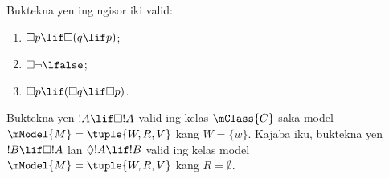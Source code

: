 \documentclass[../../../include/open-logic-section]{subfiles}
\begin{document}
\begin{prob}
  Buktekna yen ing ngisor iki valid:
  \begin{enumerate}
  \item $\Box p \lif \Box (q \lif p)$;
  \item $\Box \lnot \lfalse$;
  \item $\Box p \lif (\Box q \lif \Box p)$.
  \end{enumerate}
\end{prob}

\begin{prob}
  Buktekna yen $!A \lif \Box!A$ valid ing kelas $\mClass{C}$ saka
  model $\mModel{M} = \tuple{W, R, V}$ kang $W = \{w\}$. Kajaba iku,
  buktekna yen $!B \lif \Box !A$ lan $\Diamond !A \lif !B$ valid ing
  kelas model $\mModel{M} = \tuple{W, R, V}$ kang
  $R = \emptyset$.
\end{prob}
\end{document}
